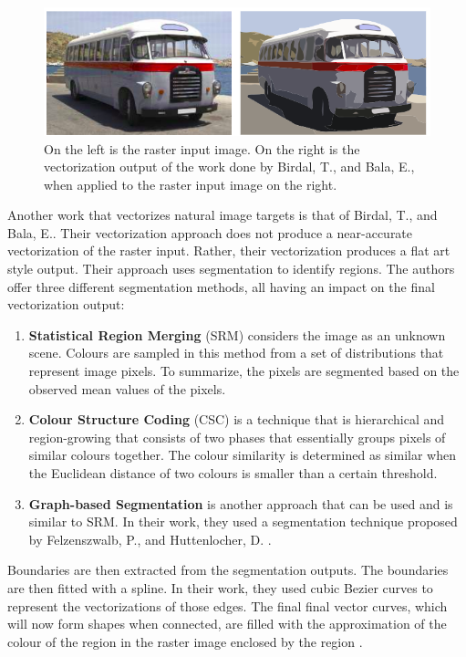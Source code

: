 \begin{figure}[h]
	\centering
	\includegraphics[scale=0.65]{images/chap02-rrl/birdal-output.png}
	\caption{On the left is the raster input image. On the right is the vectorization output of the work done by Birdal, T., and Bala, E., when applied to the raster input image on the right.}
	\label{fig:birdal}
\end{figure}

Another work that vectorizes natural image targets is that of Birdal, T., and Bala, E.. Their vectorization approach does not produce a near-accurate vectorization of the raster input. Rather, their vectorization produces a flat art style output. Their approach uses segmentation to identify regions. The authors offer three different segmentation methods, all having an impact on the final vectorization output:

\begin{enumerate}
	\item \textbf{Statistical Region Merging} (SRM) considers the image as an unknown scene. Colours are sampled in this method from a set of distributions that represent image pixels. To summarize, the pixels are segmented based on the observed mean values of the pixels.
	
	\item \textbf{Colour Structure Coding} (CSC) is a technique that is hierarchical and region-growing that consists of two phases that essentially groups pixels of similar colours together. The colour similarity is determined as similar when the Euclidean distance of two colours is smaller than a certain threshold.
	
	\item \textbf{Graph-based Segmentation} is another approach that can be used and is similar to SRM. In their work, they used a segmentation technique proposed by Felzenszwalb, P., and Huttenlocher, D. \cite{efficientgraphbasedimagesegmentation}.
\end{enumerate}

Boundaries are then extracted from the segmentation outputs. The boundaries are then fitted with a spline. In their work, they used cubic Bezier curves to represent the vectorizations of those edges. The final final vector curves, which will now form shapes when connected, are filled with the approximation of the colour of the region in the raster image enclosed by the region \cite{anovelmethodforvectorization}.

